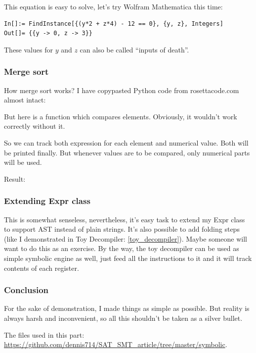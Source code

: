 This equation is easy to solve, let's try Wolfram Mathematica this time:

\begin{lstlisting}
In[]:= FindInstance[{(y*2 + z*4) - 12 == 0}, {y, z}, Integers]
Out[]= {{y -> 0, z -> 3}}
\end{lstlisting}

These values for $y$ and $z$ can also be called ``inputs of death''.

\subsubsection{Merge sort}

How merge sort works?
I have copypasted Python code from rosettacode.com almost intact:



But here is a function which compares elements.
Obviously, it wouldn't work correctly without it.

So we can track both expression for each element and numerical value.
Both will be printed finally.
But whenever values are to be compared, only numerical parts will be used.

Result:



\subsubsection{Extending Expr class}

This is somewhat senseless, nevertheless, it's easy task to extend my Expr class to support \ac{AST} instead of
plain strings.
It's also possible to add folding steps (like I demonstrated in Toy Decompiler: \ref{toy_decompiler}).
Maybe someone will want to do this as an exercise.
By the way, the toy decompiler can be used as simple symbolic engine as well,
just feed all the instructions to it and it will track contents of each register.

\subsubsection{Conclusion}

For the sake of demonstration, I made things as simple as possible.
But reality is always harsh and inconvenient, so all this shouldn't be taken as a silver bullet.

The files used in this part: \url{https://github.com/dennis714/SAT_SMT_article/tree/master/symbolic}.

